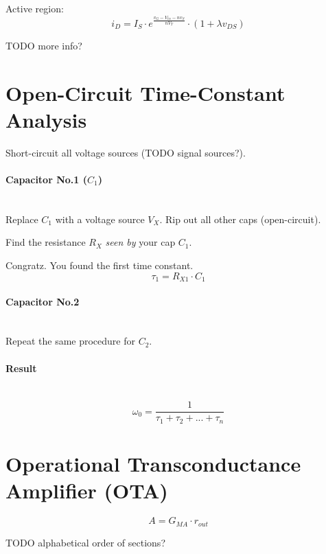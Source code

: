 \documentclass[twocolumn]{article}
\begin{document}
    Active region:
    $$i_D = I_S \cdot e^{\frac{v_G - V_{tn} - n v_S}{nV_T}}
            \cdot (1 + \lambda v_{DS})$$

    TODO more info?

  \section{Open-Circuit Time-Constant Analysis}
    Short-circuit all voltage sources (TODO signal sources?).

    \paragraph{Capacitor No.1 ($C_1$)} \hfill \\
      Replace $C_1$ with a voltage source $V_X$.
      Rip out all other caps (open-circuit).
  
      Find the resistance $R_X$ \emph{seen by} your cap $C_1$.
  
      Congratz. You found the first time constant.
      $$\tau_1 = R_{X1} \cdot C_1$$

    \paragraph{Capacitor No.2} \hfill \\
      Repeat the same procedure for $C_2$.

    \paragraph{Result} \hfill \\
      $$\omega_0 = \frac{1}{\tau_1 + \tau_2 + ... + \tau_n}$$

  \section{Operational Transconductance Amplifier (OTA)}
    $$A = G_{MA} \cdot r_{out}$$

  TODO alphabetical order of sections?
\end{document}
